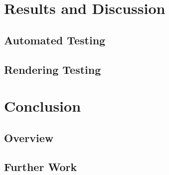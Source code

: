 \documentclass[nobib, a4paper, twoside, justified]{tufte-book}
\begin{document}
\chapter{Results and Discussion}%
\label{cha:results_and_discussion}

\section{Automated Testing}%
\label{sec:automated_testing}

\section{Rendering Testing}%
\label{sec:rendering_testing}

\chapter{Conclusion}%
\label{cha:conclusion}

\section{Overview}%
\label{sec:overview}

\section{Further Work}%
\label{sec:further_work}



\backmatter

\printbibliography[heading=bibintoc]
\end{document}
